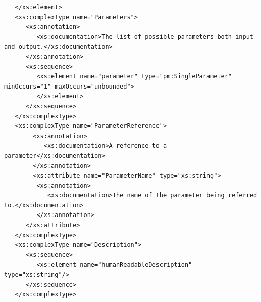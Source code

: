 \documentclass[a4paper,11pt] {ivoa}
\begin{document}
\begin{lstlisting}
   </xs:element>
   <xs:complexType name="Parameters">
      <xs:annotation>
         <xs:documentation>The list of possible parameters both input and output.</xs:documentation>
      </xs:annotation>
      <xs:sequence>
         <xs:element name="parameter" type="pm:SingleParameter" minOccurs="1" maxOccurs="unbounded">
         </xs:element>
      </xs:sequence>
   </xs:complexType>
   <xs:complexType name="ParameterReference">
        <xs:annotation>
           <xs:documentation>A reference to a parameter</xs:documentation>
        </xs:annotation>
        <xs:attribute name="ParameterName" type="xs:string">
         <xs:annotation>
            <xs:documentation>The name of the parameter being referred to.</xs:documentation>
         </xs:annotation>
      </xs:attribute>
   </xs:complexType>
   <xs:complexType name="Description">
      <xs:sequence>
         <xs:element name="humanReadableDescription" type="xs:string"/>
      </xs:sequence>
   </xs:complexType>


\end{lstlisting}
\end{document}

